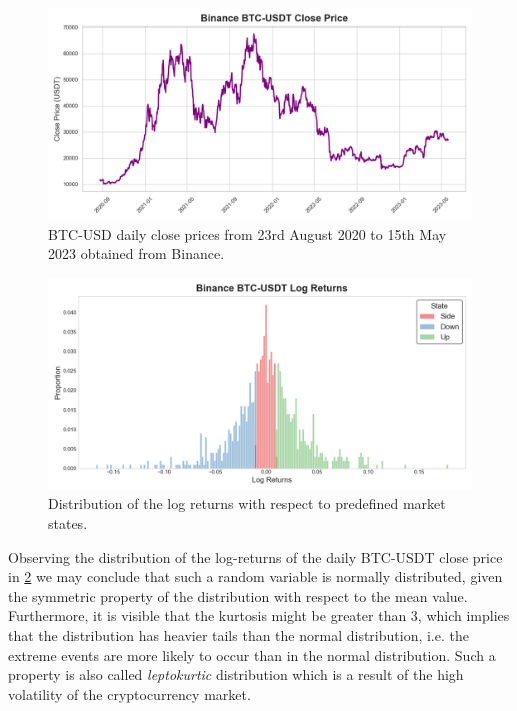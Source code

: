\begin{figure}[htbp]
    \begin{center}
        \includegraphics[width=1.0\textwidth]{Figs/BTC-USD.png}
        \caption{BTC-USD daily close prices from 23rd August 2020 to 15th May 2023 obtained from Binance. \citep{tradingview}}
        \label{fig:BTC-USD}
    \end{center}
\end{figure}

\begin{figure}[htbp]
    \begin{center}
        \includegraphics[width=1.0\textwidth]{Figs/BTC-USD_hist.png}
        \caption{Distribution of the log returns with respect to predefined market states. \citep{tradingview}}
        \label{fig:BTC-USD-distribution}
    \end{center}
\end{figure}

Observing the distribution of the log-returns of the daily BTC-USDT close price in \ref{fig:BTC-USD-distribution} we may conclude that such a random variable is normally distributed,
given the symmetric property of the distribution with respect to the mean value. Furthermore, it is visible that the kurtosis might be greater than 3,
which implies that the distribution has heavier tails than the normal distribution, i.e. the extreme events are more likely to occur than in the normal distribution.
Such a property is also called \textit{leptokurtic} distribution which is a result of the high volatility of the cryptocurrency market. \citep{Peters1994}

